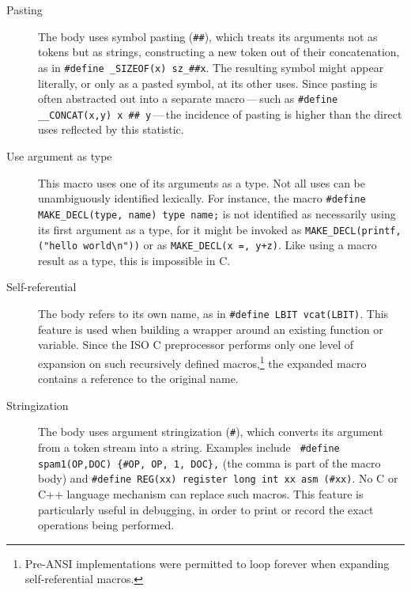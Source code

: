 \begin{description}
\item[Pasting]
  The body uses symbol pasting ({\tt \#\#}), which treats its arguments not
  as tokens but as strings, constructing a new token out of their
  concatenation, as in {\tt \#define \verb|_SIZEOF|(x) \verb|sz_|\#\#x}.
  The resulting symbol might appear literally, or only as a pasted symbol,
  at its other uses.  Since pasting is often abstracted out into a separate
  macro\,---\,such as {\tt \#define \verb|__CONCAT|(x,y) x \#\#
  y}\,---\,the incidence of pasting is higher than the direct uses
  reflected by this statistic.

\item[Use argument as type]
  This macro uses one of its arguments as a type.  Not all uses can be
  unambiguously identified lexically.  For instance, the macro 
  {\tt \#define \verb|MAKE_DECL|(type, name) type name;}
  is not identified as necessarily using its first argument as a type, for
  it might be invoked as {\tt \verb|MAKE_DECL|(printf, ("hello
  world\verb|\|n"))} or as {\tt \verb|MAKE_DECL|(x =, y+z)}.
  Like using a macro result
  as a type, this is impossible in C\@.

\item[Self-referential]
  The body refers to its own name, as in {\tt \#define LBIT vcat(LBIT)}.
  This feature is used when building a wrapper around an existing function
  or variable.  Since the ISO C preprocessor performs only one level of
  expansion on such recursively defined macros,\footnote{Pre-ANSI
    implementations were permitted to loop forever when expanding
    self-referential macros.} the expanded macro contains a reference to
  the original name.

\item[Stringization]
  The body uses argument stringization ({\tt \#}), which converts its
  argument from a token stream into a string.  Examples include {\tt
  \#define spam1(OP,DOC) \verb|{|\#OP, OP, 1, DOC\verb|}|,} (the comma is
part of the macro body) and {\tt \#define REG(xx) register long int xx asm
(\#xx)}.  No C or C++ language mechanism can replace such macros.  This
feature is particularly useful in debugging, in order to print or record
the exact operations being performed.

\end{description}

